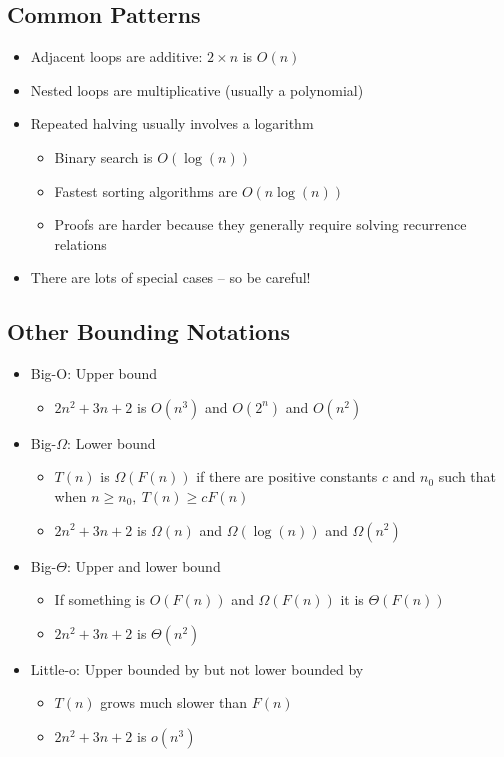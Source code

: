 \documentclass[10pt]{article}
\begin{document}
\subsection*{Common Patterns}
\begin{itemize}
\item Adjacent loops are additive: $2\times n$ is $O(n)$
\item Nested loops are multiplicative (usually a polynomial)
\item Repeated halving usually involves a logarithm
\begin{itemize}
\item Binary search is $O(\log(n))$
\item Fastest sorting algorithms are $O(n\log(n))$
\item Proofs are harder because they generally require solving recurrence relations
\end{itemize}
\item There are lots of special cases -- so be careful!
\end{itemize}

\subsection*{Other Bounding Notations}
\begin{itemize}
\item Big-O: Upper bound
\begin{itemize}
\item $2n^2 +3n+2$ is $O(n^3)$ and $O(2^n)$ and $O(n^2)$
\end{itemize}
\item Big-$\Omega$: Lower bound
\begin{itemize}
\item $T(n)$ is $\Omega(F(n))$ if there are positive constants $c$ and $n_0$ such that when $n\geq n_0,\ T(n) \geq cF(n)$
\item $2n^2 + 3n + 2$ is $\Omega(n)$ and $\Omega(\log(n))$ and $\Omega(n^2)$
\end{itemize}
\item Big-$\Theta$: Upper and lower bound
\begin{itemize}
\item If something is $O(F(n))$ and $\Omega(F(n))$ it is $\Theta(F(n))$
\item $2n^2+3n+2$ is $\Theta(n^2)$
\end{itemize}
\item Little-o: Upper bounded by but not lower bounded by
\begin{itemize}
\item $T(n)$ grows much slower than $F(n)$
\item $2n^2+3n+2$ is $o(n^3)$
\end{itemize}
\end{itemize}
\end{document}

